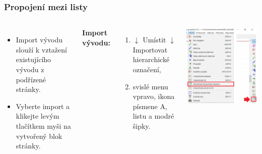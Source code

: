 \documentclass{beamer}
\begin{document}
\begin{frame}
	\frametitle{Propojení mezi listy}
	\begin{columns}
	
		\small
		
		\begin{itemize}
			\item Import vývodu slouží k vztažení existujícího vývodu z podřízené stránky.
			\item Vyberte import a klikejte levým tlačítkem myši na vytvořený blok stránky.
		\end{itemize}
		
		
		\textbf{Import vývodu:}
		\begin{enumerate}
			\item $\downarrow$ Umístit $\downarrow$ Importovat hierarchické označení,
			\item svislé menu vpravo, ikona písmene A, listu a modré šipky.
		\end{enumerate}
		
		\begin{center}
			\includegraphics[width=\textwidth]{obr/dalsi_strana09.png}
		\end{center}
		
	\end{columns}
\end{frame}
\end{document}
